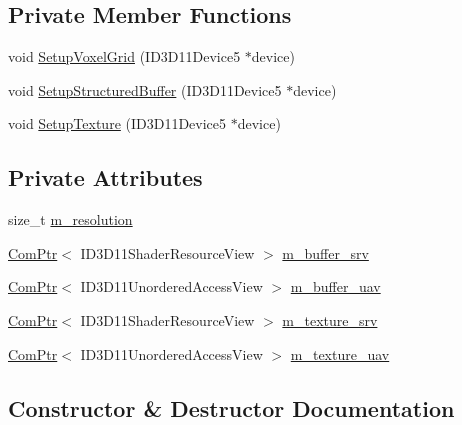 \subsection*{Private Member Functions}
\begin{DoxyCompactItemize}
\item 
void \hyperlink{classmage_1_1_voxel_grid_a1bee3c90eb46fc19fa7bce22572a0a4a}{Setup\+Voxel\+Grid} (I\+D3\+D11\+Device5 $\ast$device)
\item 
void \hyperlink{classmage_1_1_voxel_grid_ae632716e94bba5d3af94de7998771365}{Setup\+Structured\+Buffer} (I\+D3\+D11\+Device5 $\ast$device)
\item 
void \hyperlink{classmage_1_1_voxel_grid_a52bed8052ca19b3d31a2dd8f0c9c027d}{Setup\+Texture} (I\+D3\+D11\+Device5 $\ast$device)
\end{DoxyCompactItemize}
\subsection*{Private Attributes}
\begin{DoxyCompactItemize}
\item 
size\+\_\+t \hyperlink{classmage_1_1_voxel_grid_ab7d1b3d265db5f26f73dd4d7fad106a6}{m\+\_\+resolution}
\item 
\hyperlink{namespacemage_ae74f374780900893caa5555d1031fd79}{Com\+Ptr}$<$ I\+D3\+D11\+Shader\+Resource\+View $>$ \hyperlink{classmage_1_1_voxel_grid_a085ef56558b149e65f41ddf999eeb5cb}{m\+\_\+buffer\+\_\+srv}
\item 
\hyperlink{namespacemage_ae74f374780900893caa5555d1031fd79}{Com\+Ptr}$<$ I\+D3\+D11\+Unordered\+Access\+View $>$ \hyperlink{classmage_1_1_voxel_grid_ab280f80bc83e55e762bb19dec30ed37f}{m\+\_\+buffer\+\_\+uav}
\item 
\hyperlink{namespacemage_ae74f374780900893caa5555d1031fd79}{Com\+Ptr}$<$ I\+D3\+D11\+Shader\+Resource\+View $>$ \hyperlink{classmage_1_1_voxel_grid_a15a383e4fcbc948e89537c8a391fdd0f}{m\+\_\+texture\+\_\+srv}
\item 
\hyperlink{namespacemage_ae74f374780900893caa5555d1031fd79}{Com\+Ptr}$<$ I\+D3\+D11\+Unordered\+Access\+View $>$ \hyperlink{classmage_1_1_voxel_grid_a8e253c0e029cd47700a259500d2bce02}{m\+\_\+texture\+\_\+uav}
\end{DoxyCompactItemize}


\subsection{Constructor \& Destructor Documentation}
\hypertarget{classmage_1_1_voxel_grid_a82ef6def342bbc9e9139a081dc15a014}{}\label{classmage_1_1_voxel_grid_a82ef6def342bbc9e9139a081dc15a014} 
